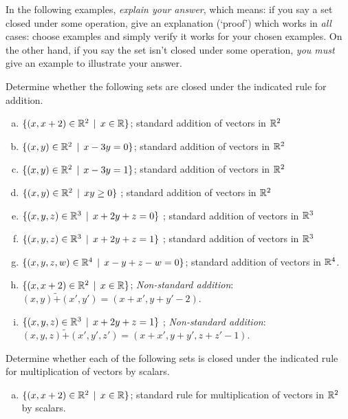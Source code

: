  
 
 
  

 
 In the following examples, {\it explain your answer}, which means: if you say a set closed under some operation, give an explanation (`proof') which works  in {\it all} cases:  choose examples and simply verify it works for your chosen examples. On the other hand, if you say the set isn't closed under some operation, {\it you must} give an example to illustrate your answer. 

  \begin{prob} \label{prob04.1} Determine whether   the following sets are closed under the indicated rule for addition. 

  
\begin{enumerate}[a)]
\medskip
\item  $\{(x, x+2) \in \mathbb{R}^2\,\mid \, x\in \mathbb{R} \}$; standard addition of vectors in $\mathbb{R}^2$ \medskip

\item\sov  $\{(x, y) \in \mathbb{R}^2\,\mid \, x -3y=0  \}$; standard addition of vectors in $\mathbb{R}^2$ \medskip
%

\item $\{(x, y) \in \mathbb{R}^2\,\mid \, x -3y=1  \}$; standard addition of vectors in $\mathbb{R}^2$ \medskip
%

\item\sov  $\{(x, y) \in \mathbb{R}^2\,\mid \, xy \ge 0  \}$ ; standard addition of vectors in $\mathbb{R}^2$\medskip
%
 
\item  $\{(x, y, z) \in \mathbb{R}^3\,\mid \, x+2y+z=0  \}$ ; standard addition of vectors in $\mathbb{R}^3$ \medskip
%
\item\sov  $\{(x, y, z) \in \mathbb{R}^3\,\mid \, x+2y+z=1  \}$ ; standard addition of vectors in $\mathbb{R}^3$\medskip 
%
\item  $\{(x, y, z, w) \in \mathbb{R}^4\,\mid \, x-y+z-w=0  \}$; standard addition of vectors in $\mathbb{R}^4$.\medskip 
%
\item\sov  $\{(x, x+2) \in \mathbb{R}^2\,\mid \, x\in \mathbb{R} \}$; {\it Non-standard addition}: $(x,y) \tilde+ (x',y')=(x+x', y+y'-2)$.    \medskip
%
\item  $\{(x, y, z) \in \mathbb{R}^3\,\mid \, x+2y+z=1  \}$ ; {\it Non-standard addition}: $(x,y,z) \tilde+ (x',y',z')=(x+x', y+y', z+z'-1)$.\medskip 
%
\end{enumerate}

\end{prob} \begin{prob} \label{prob04.2} Determine whether each of the following sets is closed under the indicated rule for multiplication of vectors  by scalars.
\begin{enumerate}[a)]
\medskip
\item $\{(x, x+2) \in \mathbb{R}^2\,\mid \, x\in \mathbb{R} \}$; standard rule for multiplication of vectors  in $\mathbb{R}^2$ by scalars. \medskip


\end{enumerate}
\end{prob}
